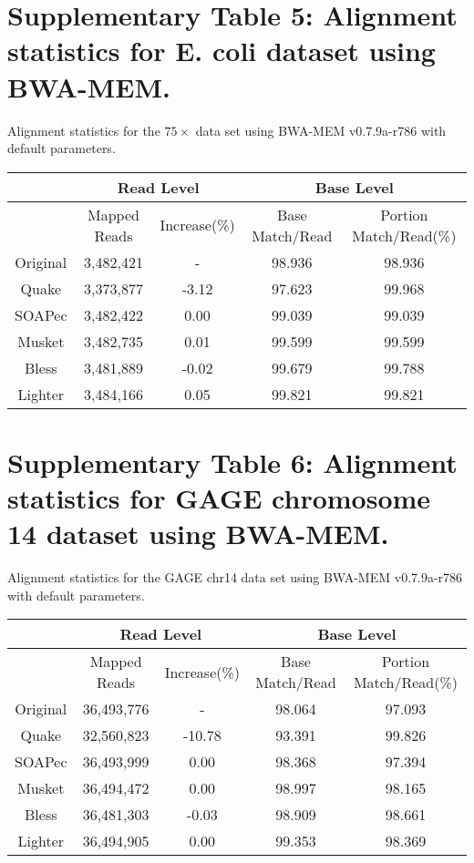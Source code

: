 \documentclass[10pt]{article}
\begin{document}
\section*{Supplementary Table 5: Alignment statistics for E. coli dataset using BWA-MEM.}

\noindent Alignment statistics for the $75\times$ \ecoli data set using BWA-MEM \cite{li2013aligning} v0.7.9a-r786 with default parameters.

\begin{table}[h!] 
\begin{tabular}{|c|c|c||c|c|} \hline
	 & \multicolumn{2}{|c||}{Read Level} & \multicolumn{2}{|c|}{Base Level} \\ \hline
     & Mapped Reads & Increase(\%) & Base Match/Read & Portion Match/Read(\%) \\ \hline
Original&	3,482,421&	-&	98.936&	98.936 \\ \hline
Quake&	3,373,877&	-3.12&	97.623&	99.968 \\ \hline
SOAPec&	3,482,422&	0.00&	99.039&	99.039 \\ \hline
Musket&	3,482,735&	0.01&	99.599&	99.599 \\ \hline
Bless&	3,481,889&	-0.02&	99.679&	99.788 \\ \hline
Lighter&	3,484,166&	0.05&	99.821&	99.821  \\ \hline
\end{tabular}
\end{table}
\clearpage

\section*{Supplementary Table 6: Alignment statistics for GAGE chromosome 14 dataset using BWA-MEM.}

\noindent Alignment statistics for the GAGE chr14 data set using BWA-MEM \cite{li2013aligning} v0.7.9a-r786 with default parameters.

\begin{table}[h!]
\begin{tabular}{|c|c|c||c|c|} \hline
	 & \multicolumn{2}{|c||}{Read Level} & \multicolumn{2}{|c|}{Base Level} \\ \hline
     & Mapped Reads & Increase(\%) & Base Match/Read & Portion Match/Read(\%) \\ \hline
Original&	36,493,776& - 	&	98.064&	97.093 \\ \hline
Quake&	32,560,823&	-10.78&	93.391&	99.826 \\ \hline
SOAPec&	36,493,999&	0.00&	98.368&	97.394 \\ \hline
Musket&	36,494,472&	0.00&	98.997&	98.165 \\ \hline
Bless&	36,481,303&	-0.03&	98.909&	98.661 \\ \hline
Lighter&	36,494,905&	0.00&	99.353&	98.369 \\ \hline
\end{tabular}
\end{table}
\end{document}
